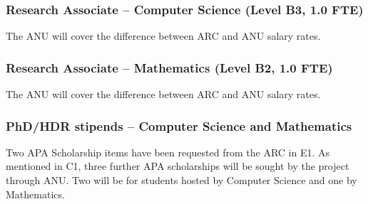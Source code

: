\documentclass[a4paper,fontsize=12pt]{scrartcl}
\begin{document}
%
%




\subsubsection*{Research Associate – Computer Science (Level B3, 1.0 FTE)}

The ANU will cover the difference between ARC and ANU salary rates.


\subsubsection*{Research Associate – Mathematics (Level B2, 1.0 FTE)}

The ANU will cover the difference between ARC and ANU salary rates.

\subsubsection*{PhD/HDR stipends – Computer Science and Mathematics}

Two APA Scholarship items have been requested from the ARC in E1.
As mentioned in C1, three further APA scholarships will be 
sought by the project through ANU. Two will be for students
hosted by Computer Science and one by Mathematics.


\end{document}
